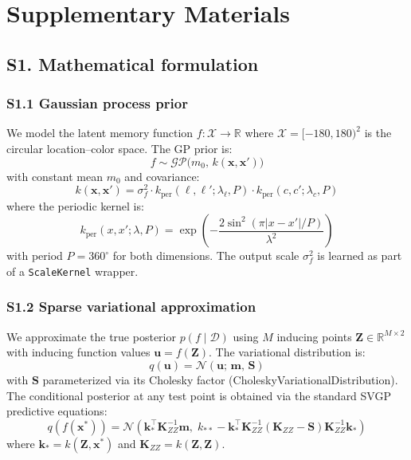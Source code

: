 \documentclass[11pt,letterpaper]{article}
\newcommand{\GP}{\mathcal{GP}}
\newcommand{\R}{\mathbb{R}}
\newcommand{\bx}{\mathbf{x}}
\newcommand{\bZ}{\mathbf{Z}}
\newcommand{\bu}{\mathbf{u}}
\newcommand{\bm}{\mathbf{m}}
\begin{document}
\clearpage
\appendix
\setcounter{figure}{0}
\setcounter{table}{0}
\renewcommand{\thefigure}{S\arabic{figure}}
\renewcommand{\thetable}{S\arabic{table}}

\section*{Supplementary Materials}

\subsection*{S1. Mathematical formulation}

\subsubsection*{S1.1 Gaussian process prior}

We model the latent memory function $f: \mathcal{X} \to \R$ where $\mathcal{X} = [-180, 180)^2$ is the circular location--color space. The GP prior is:
\[
f \sim \GP\bigl(m_0, \, k(\bx, \bx')\bigr)
\]
with constant mean $m_0$ and covariance:
\[
k(\bx, \bx') = \sigma^2_f \cdot k_{\mathrm{per}}(\ell, \ell'; \lambda_\ell, P) \cdot k_{\mathrm{per}}(c, c'; \lambda_c, P)
\]
where the periodic kernel is:
\[
k_{\mathrm{per}}(x, x'; \lambda, P) = \exp\!\left(-\frac{2 \sin^2(\pi |x - x'| / P)}{\lambda^2}\right)
\]
with period $P = 360^\circ$ for both dimensions. The output scale $\sigma^2_f$ is learned as part of a \texttt{ScaleKernel} wrapper.

\subsubsection*{S1.2 Sparse variational approximation}

We approximate the true posterior $p(f \mid \mathcal{D})$ using $M$ inducing points $\bZ \in \R^{M \times 2}$ with inducing function values $\bu = f(\bZ)$. The variational distribution is:
\[
q(\bu) = \mathcal{N}(\bu; \, \bm, \, \mathbf{S})
\]
with $\mathbf{S}$ parameterized via its Cholesky factor (CholeskyVariationalDistribution). The conditional posterior at any test point is obtained via the standard SVGP predictive equations:
\[
q(f(\bx^*)) = \mathcal{N}\!\left(
    \mathbf{k}_*^\top \mathbf{K}_{ZZ}^{-1} \bm, \;
    k_{**} - \mathbf{k}_*^\top \mathbf{K}_{ZZ}^{-1}(\mathbf{K}_{ZZ} - \mathbf{S})\mathbf{K}_{ZZ}^{-1} \mathbf{k}_*
\right)
\]
where $\mathbf{k}_* = k(\bZ, \bx^*)$ and $\mathbf{K}_{ZZ} = k(\bZ, \bZ)$.
\end{document}
